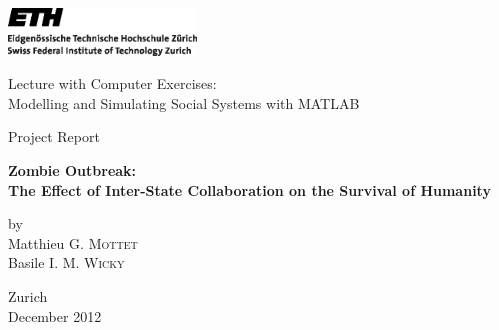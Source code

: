 
\thispagestyle{empty}

\begin{center}
\includegraphics[width=5cm]{ETHlogo.eps}

\bigskip
\bigskip
\bigskip


\LARGE{ 	Lecture with Computer Exercises:\\ }
\LARGE{ Modelling and Simulating Social Systems with MATLAB\\}

\bigskip
\bigskip
\bigskip
\bigskip

\small{Project Report}\\

\bigskip
\bigskip
\bigskip


\huge{\bf{Zombie Outbreak:\\The Effect of Inter-State Collaboration on the Survival of Humanity}}

\bigskip
\bigskip
\bigskip


\small{by\\}
\bigskip
\bigskip
\LARGE{Matthieu G. \textsc{Mottet}\\Basile I. M. \textsc{Wicky}}

\bigskip
\bigskip
\bigskip
\bigskip
\bigskip
\bigskip
\bigskip
\bigskip
\bigskip
\bigskip
\bigskip
\bigskip
\bigskip
\bigskip
\bigskip
\bigskip
\bigskip
\bigskip
Zurich\\
December 2012\\

\end{center}


